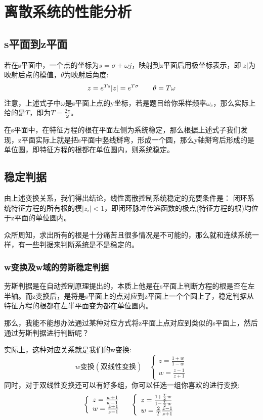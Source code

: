\documentclass[12pt, a4paper, oneside]{ctexbook}
\begin{document}
\section{离散系统的性能分析} 
\subsection{s平面到z平面} 
若在s平面中，一个点的坐标为$s=\sigma+\omega j$，映射到z平面后用极坐标表示，即$|z|$为映射后点的模值，$\theta$为映射后角度:
$$
z=e^{Ts}\\
|z|=e^{T\sigma}\qquad \theta=T\omega
$$
注意，上述式子中$\omega$是s平面上点的y坐标，若是题目给你采样频率$\omega_c$，那么实际上给的是$T$，即为$T=\frac{2\pi}{\omega}$。

在s平面中，在特征方程的根在平面左侧为系统稳定，那么根据上述式子我们发现，z平面实际上就是把s平面中竖线掰弯，形成一个圆，那么y轴掰弯后形成的是单位圆，即特征方程的根都在单位圆内，则系统稳定。
\subsection{稳定判据}
由上述变换关系，我们得出结论，线性离散控制系统稳定的充要条件是：
闭环系统特征方程的所有根的模$|z_i|<1$，即闭环脉冲传递函数的极点(特征方程的根)均位于z平面的单位圆内。

众所周知，求出所有的根是十分痛苦且很多情况是不可能的，那么就和连续系统一样，有一些判据来判断系统是不是稳定的。
\subsubsection{w变换及w域的劳斯稳定判据} 
劳斯判据是在自动控制原理提出的，本质上他是在s平面上判断方程的根是否在左半轴。而z变换后，是将是s平面上的点对应到z平面上一个个圆上了，稳定判据从特征方程的根都在左半平面变为都在单位圆内。

\noindent 那么，我能不能想办法通过某种对应方式将z平面上点对应到类似的s平面上，然后通过劳斯判据进行判断呢？

\noindent 实际上，这种对应关系就是我们的w变换:
$$
w变换(双线性变换)\quad
\left\{  
\begin{array}{lr}  
	z=\frac{1+w}{1-w}   \\  
	w=\frac{z-1}{z+1}  
\end{array}  
\right.  
$$
同时，对于双线性变换还可以有好多组，你可以任选一组你喜欢的进行变换:
$$
\left\{  
\begin{array}{lr}  
	z=\frac{w+1}{w-1}   \\  
	w=\frac{z+1}{z-1}  
\end{array}  
\right.\quad
\left\{  
\begin{array}{lr}  
	z=\frac{1+\frac{T}{2}w}{1-\frac{T}{2}w}   \\  
	w=\frac{2}{T}\frac{z-1}{z+1}  
\end{array}  
\right.
\\
$$
\end{document}
